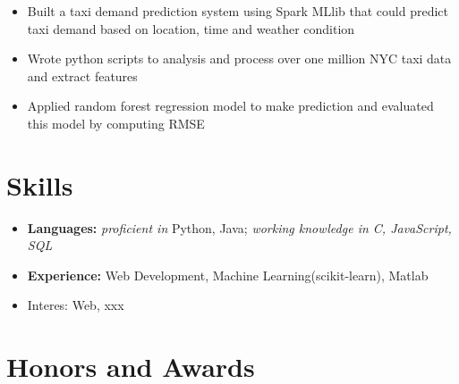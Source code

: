 \documentclass{resume}
\begin{document}

\begin{itemize}
  \item Built a taxi demand prediction system using Spark MLlib that could predict taxi demand based on location, time and weather condition
  \item Wrote python scripts to analysis and process over one million NYC taxi data and extract features
  \item Applied random forest regression model to make prediction and evaluated this model by computing RMSE
\end{itemize}


\section{Skills}
\begin{itemize}[parsep=0.5ex]
  \item \textbf{Languages: }\textit{proficient in }Python, Java; \textit{working knowledge in C, JavaScript, SQL} 
  \item \textbf{Experience: }Web Development, Machine Learning(scikit-learn), Matlab
  \item Interes: Web, xxx
\end{itemize}

\section{Honors and Awards}


%
%
\end{document}
